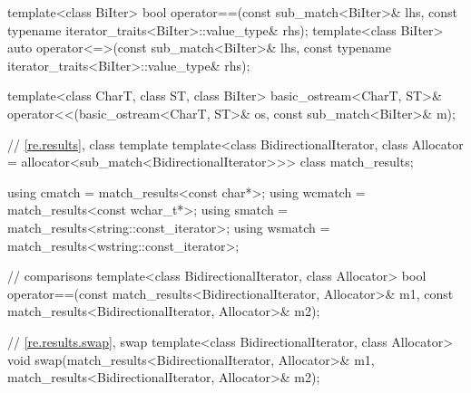 \begin{codeblock}
{  template<class BiIter>
    bool operator==(const sub_match<BiIter>& lhs,
                    const typename iterator_traits<BiIter>::value_type& rhs);
  template<class BiIter>
    auto operator<=>(const sub_match<BiIter>& lhs,
                     const typename iterator_traits<BiIter>::value_type& rhs);

  template<class CharT, class ST, class BiIter>
    basic_ostream<CharT, ST>&
      operator<<(basic_ostream<CharT, ST>& os, const sub_match<BiIter>& m);

  // \ref{re.results}, class template 
  template<class BidirectionalIterator,
           class Allocator = allocator<sub_match<BidirectionalIterator>>>
    class match_results;

  using cmatch  = match_results<const char*>;
  using wcmatch = match_results<const wchar_t*>;
  using smatch  = match_results<string::const_iterator>;
  using wsmatch = match_results<wstring::const_iterator>;

  //  comparisons
  template<class BidirectionalIterator, class Allocator>
    bool operator==(const match_results<BidirectionalIterator, Allocator>& m1,
                    const match_results<BidirectionalIterator, Allocator>& m2);

  // \ref{re.results.swap},  swap
  template<class BidirectionalIterator, class Allocator>
    void swap(match_results<BidirectionalIterator, Allocator>& m1,
              match_results<BidirectionalIterator, Allocator>& m2);

}
\end{codeblock}
